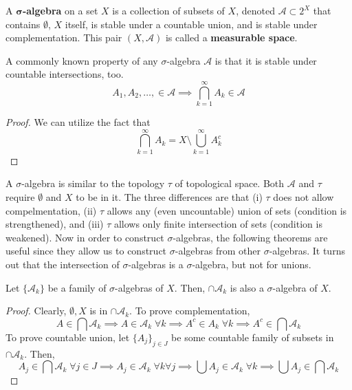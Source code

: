   \begin{definition}
    A \textbf{$\boldsymbol{\sigma}$-algebra} on a set $X$ is a collection  of subsets of $X$, denoted $\mathcal{A} \subset 2^X$ that contains $\emptyset$, $X$ itself, is stable under a countable union, and is stable under complementation. This pair $(X, \mathcal{A})$ is called a \textbf{measurable space}. 
  \end{definition}

  \begin{lemma}
    A commonly known property of any $\sigma$-algebra $\mathcal{A}$ is that it is stable under countable intersections, too. 
    \begin{equation}
      A_1, A_2, \ldots, \in \mathcal{A} \implies \bigcap_{k=1}^\infty A_k \in \mathcal{A}
    \end{equation}
  \end{lemma}
  \begin{proof}
    We can utilize the fact that 
    \begin{equation}
      \bigcap_{k=1}^\infty A_k = X \setminus \bigcup_{k=1}^\infty A_k^c
    \end{equation}
  \end{proof}

  A $\sigma$-algebra is similar to the topology $\tau$ of topological space. Both $\mathcal{A}$ and $\tau$ require $\emptyset$ and $X$ to be in it. The three differences are that (i) $\tau$ does not allow compelmentation, (ii) $\tau$ allows any (even uncountable) union of sets (condition is strengthened), and (iii) $\tau$ allows only finite intersection of sets (condition is weakened). Now in order to construct $\sigma$-algebras, the following theorems are useful since they allow us to construct $\sigma$-algebras from other $\sigma$-algebras. It turns out that the intersection of $\sigma$-algebras is a $\sigma$-algebra, but not for unions. 

  \begin{theorem}
    Let $\{\mathcal{A}_k\}$ be a family of $\sigma$-algebras of $X$. Then, $\cap \mathcal{A}_k$ is also a $\sigma$-algebra of $X$. 
  \end{theorem}
  \begin{proof}
    Clearly, $\emptyset, X$ is in $\cap \mathcal{A}_k$. To prove complementation, 
    \begin{equation}
      A \in \bigcap \mathcal{A}_k \implies A \in \mathcal{A}_k \; \forall k \implies A^c \in A_k \; \forall k \implies A^c \in \bigcap \mathcal{A}_k
    \end{equation}
    To prove countable union, let $\{A_j\}_{j \in J}$ be some countable family of subsets in $\cap \mathcal{A}_k$. Then, 
    \begin{equation}
      A_j \in \bigcap \mathcal{A}_k \; \forall j \in J \implies A_j \in \mathcal{A}_k \; \forall k \forall j \implies \bigcup A_j \in \mathcal{A}_k \; \forall k \implies \bigcup A_j \in \bigcap \mathcal{A}_k
    \end{equation}
  \end{proof}

